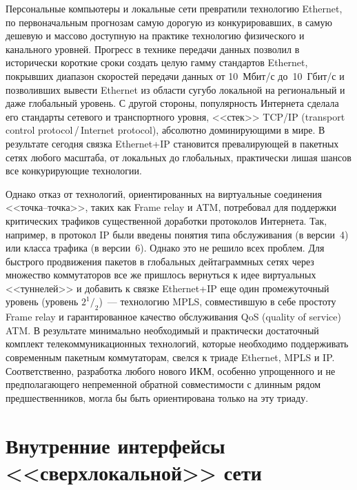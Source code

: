 \begin{multicols}{2}
     Персональные компьютеры и локальные сети превратили технологию Ethernet, по 
первоначальным прогнозам самую дорогую из конкурировавших, в самую дешевую и 
массово доступную на практике технологию физического и канального уровней. Прогресс в 
технике передачи данных позволил в исторически короткие сроки создать целую гамму 
стандартов Ethernet, покрывших диапазон скоростей передачи данных от 10~Мбит/с 
до~10~Гбит/с и позволивших вывести Ethernet из области сугубо локальной на 
региональный и даже глобальный уровень. С другой стороны, популярность Интернета 
сделала его стандарты сетевого и транспортного уровня, <<стек>> TCP/IP (transport control 
protocol\,/\,Internet protocol), абсолютно доминирующими в мире. В результате сегодня 
связка Ethernet\;+\;IP становится превалирующей в пакетных сетях любого масштаба, от 
локальных до глобальных, практически лишая шансов все конкурирующие технологии.
     
     Однако отказ от технологий, ориентированных на виртуальные соединения 
     <<точка--точка>>, таких как Frame relay и ATM, потребовал для поддержки 
критических трафиков существенной доработки протоколов Интернета. Так, например, в 
протокол IP были введены понятия типа обслуживания (в версии~4) или класса трафика (в 
версии~6). Однако это не решило всех проблем. Для быстрого продвижения пакетов в 
глобальных дейта\-грам\-мных сетях через множество коммутаторов все же пришлось 
вернуться к идее виртуальных <<туннелей>> и добавить к связке Ethernet\;+\;IP еще один 
промежуточный уровень (уровень $2^1/_2$)~--- технологию MPLS, совместившую в себе простоту Frame relay и гарантированное 
качество 
обслуживания QoS (quality of %
service) ATM. В результате минимально необходимый и 
практически достаточный комплект телекоммуникационных технологий, которые 
необходимо поддерживать современным пакетным %
 комму\-та\-то\-рам, свелся к триаде Ethernet, 
MPLS и IP. Соответственно, разработка любого нового ИКМ, особенно упрощенного и не 
предполагающего непременной обратной совместимости с длинным рядом 
предшественников, могла бы быть ориентирована только на эту триаду.

\section{Внутренние интерфейсы <<сверхлокальной>> сети}
     

\end{multicols}
